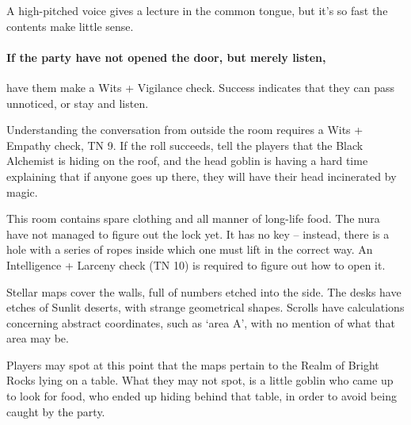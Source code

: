 \begin{multicols}{2}



\begin{boxtext}

	A high-pitched voice gives a lecture in the common tongue, but it's so fast the contents make little sense.

\end{boxtext}

\noindent
\paragraph{If the party have not opened the door, but merely listen,}
have them make a Wits + Vigilance check.
Success indicates that they can pass unnoticed, or stay and listen.

Understanding the conversation from outside the room requires a Wits + Empathy check, TN 9.
If the roll succeeds, tell the players that the Black Alchemist is hiding on the roof, and the head goblin is having a hard time explaining that if anyone goes up there, they will have their head incinerated by magic.

\goblinnuramancer



This room contains spare clothing and all manner of long-life food.
The nura have not managed to figure out the lock yet.
It has no key -- instead, there is a hole with a series of ropes inside which one must lift in the correct way.
An Intelligence + Larceny check (TN 10) is required to figure out how to open it.


\begin{boxtext}

	Stellar maps cover the walls, full of numbers etched into the side.
	The desks have etches of Sunlit deserts, with strange geometrical shapes.
	Scrolls have calculations concerning abstract coordinates, such as `area A', with no mention of what that area may be.

\end{boxtext}


\noindent
Players may spot at this point that the maps pertain to the Realm of Bright Rocks lying on a table.
What they may not spot, is a little goblin who came up to look for food, who ended up hiding behind that table, in order to avoid being caught by the party.


\end{multicols}
